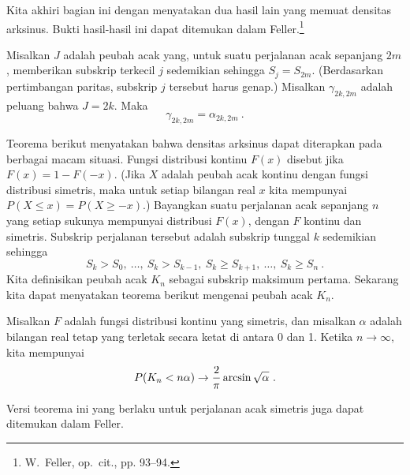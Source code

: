 Kita akhiri bagian ini dengan menyatakan dua hasil lain yang memuat densitas
arksinus. Bukti hasil-hasil ini dapat ditemukan dalam Feller.\footnote{W.~Feller,
op.\ cit., pp. 93--94.}
\begin{theorem}\label{thm 12.3.2}
Misalkan $J$ adalah peubah acak yang, untuk suatu perjalanan acak sepanjang
$2m$, memberikan subskrip terkecil $j$ sedemikian sehingga
$S_{j} = S_{2m}$. (Berdasarkan pertimbangan paritas, subskrip $j$ tersebut
harus genap.) Misalkan $\gamma_{2k, 2m}$ adalah peluang bahwa $J = 2k$. Maka
$$\gamma_{2k, 2m} = \alpha_{2k, 2m}\ .$$
\end{theorem}
Teorema berikut menyatakan bahwa densitas arksinus dapat diterapkan pada
berbagai macam situasi. Fungsi distribusi kontinu $F(x)$ disebut
 jika $F(x) = 1 - F(-x)$. (Jika $X$ adalah peubah acak kontinu
dengan fungsi distribusi simetris, maka untuk setiap bilangan real $x$ kita
mempunyai $P(X \le x) = P(X \ge -x)$.) Bayangkan suatu perjalanan acak
sepanjang $n$ yang setiap sukunya mempunyai distribusi $F(x)$, dengan $F$
kontinu dan simetris. Subskrip  perjalanan tersebut adalah subskrip tunggal $k$
sedemikian sehingga
$$S_k > S_0,\ \ldots,\ S_k > S_{k-1},\ S_k \ge S_{k+1},\ \ldots,\ S_k \ge S_n\ .$$
Kita definisikan peubah acak $K_n$ sebagai subskrip maksimum pertama. Sekarang
kita dapat menyatakan teorema berikut mengenai peubah acak $K_n$.
\begin{theorem}\label{thm 12.3.3}
Misalkan $F$ adalah fungsi distribusi kontinu yang simetris, dan misalkan
$\alpha$ adalah bilangan real tetap yang terletak secara ketat di antara 0 dan
1. Ketika $n \rightarrow \infty$, kita mempunyai
$$P(K_n < n\alpha) \rightarrow {2\over \pi} \arcsin\sqrt \alpha\ .$$
\end{theorem}
\par
Versi teorema ini yang berlaku untuk perjalanan acak simetris juga dapat
ditemukan dalam Feller.

